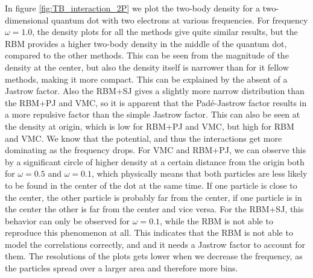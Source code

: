 In figure \eqref{fig:TB_interaction_2P} we plot the two-body density for a two-dimensional quantum dot with two electrons at various frequencies. For frequency $\omega=1.0$, the density plots for all the methods give quite similar results, but the RBM provides a higher two-body density in the middle of the quantum dot, compared to the other methods. This can be seen from the magnitude of the density at the center, but also the density itself is narrower than for it fellow methods, making it more compact. This can be explained by the absent of a Jastrow factor. Also the RBM+SJ gives a slightly more narrow distribution than the RBM+PJ and VMC, so it is apparent that the Padé-Jastrow factor results in a more repulsive factor than the simple Jastrow factor. This can also be seen at the density at origin, which is low for RBM+PJ and VMC, but high for RBM and VMC. We know that the potential, and thus the interactions get more dominating as the frequency drops. For VMC and RBM+PJ, we can observe this by a significant circle of higher density at a certain distance from the origin both for $\omega=0.5$ and $\omega=0.1$, which physically means that both particles are less likely to be found in the center of the dot at the same time. If one particle is close to the center, the other particle is probably far from the center, if one particle is in the center the other is far from the center and vice versa. For the RBM+SJ, this behavior can only be observed for $\omega=0.1$, while the RBM is not able to reproduce this phenomenon at all. This indicates that the RBM is not able to model the correlations correctly, and and it needs a Jastrow factor to account for them. The resolutions of the plots gets lower when we decrease the frequency, as the particles spread over a larger area and therefore more bins.

